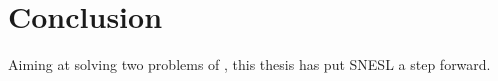 \chapter{Conclusion}
Aiming at solving two problems of , this thesis has put SNESL a step forward. 
